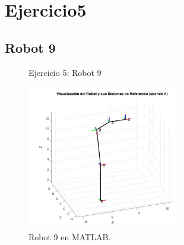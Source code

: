 \section{\textbf{Ejercicio5}}
\subsection{\textbf{Robot 9}}

\begin{figure}[H]
	\centering
	\hfill
	\caption{Ejercicio 5: Robot 9}
	\label{fig:Robot9}
\end{figure}
\begin{figure}[H]
	\centering
	\includegraphics[width=0.6\textwidth]{img/Ej53.jpg}
	\caption{Robot 9 en MATLAB.}
	\label{fig:Robot9matlab}
\end{figure}